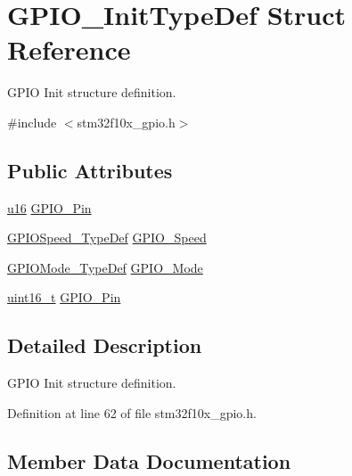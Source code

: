 \hypertarget{struct_g_p_i_o___init_type_def}{}\section{G\+P\+I\+O\+\_\+\+Init\+Type\+Def Struct Reference}
\label{struct_g_p_i_o___init_type_def}


G\+P\+IO Init structure definition.  




{\ttfamily \#include $<$stm32f10x\+\_\+gpio.\+h$>$}

\subsection*{Public Attributes}
\begin{DoxyCompactItemize}
\item 
\hyperlink{agilefox_2library_2inc_2stm32f10x__type_8h_a9e6c91d77e24643b888dbd1a1a590054}{u16} \hyperlink{struct_g_p_i_o___init_type_def_a0022c6290548ab169db718d49cad5608}{G\+P\+I\+O\+\_\+\+Pin}
\item 
\hyperlink{agilefox_2library_2inc_2stm32f10x__gpio_8h_a062ad92b67b4a1f301c161022cf3ba8e}{G\+P\+I\+O\+Speed\+\_\+\+Type\+Def} \hyperlink{struct_g_p_i_o___init_type_def_ac05832cacebc861a9acf5294d702c16b}{G\+P\+I\+O\+\_\+\+Speed}
\item 
\hyperlink{agilefox_2library_2inc_2stm32f10x__gpio_8h_a1347339e1c84a196fabbb31205eec5d4}{G\+P\+I\+O\+Mode\+\_\+\+Type\+Def} \hyperlink{struct_g_p_i_o___init_type_def_a55bd77e335c2bfeec9caa5dc922b791b}{G\+P\+I\+O\+\_\+\+Mode}
\item 
\hyperlink{_p_e___types_8h_a1f1825b69244eb3ad2c7165ddc99c956}{uint16\+\_\+t} \hyperlink{struct_g_p_i_o___init_type_def_a35fc26fc58226126c5b99478a472e5e9}{G\+P\+I\+O\+\_\+\+Pin}
\end{DoxyCompactItemize}


\subsection{Detailed Description}
G\+P\+IO Init structure definition. 

Definition at line 62 of file stm32f10x\+\_\+gpio.\+h.



\subsection{Member Data Documentation}
